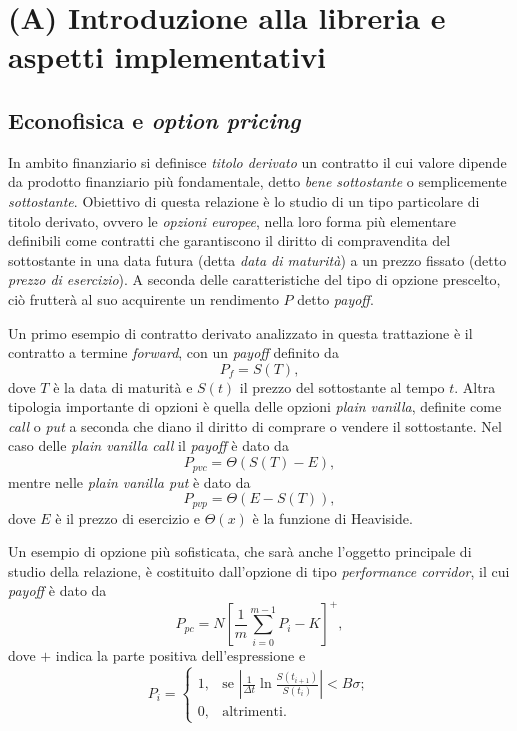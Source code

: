 \chapter{(A) Introduzione alla libreria e aspetti implementativi}
\section{Econofisica e \textit{option pricing}}
In ambito finanziario si definisce \textit{titolo derivato} un contratto il cui valore dipende da prodotto finanziario più fondamentale, detto \textit{bene sottostante} o semplicemente \textit{sottostante}. Obiettivo di questa relazione è lo studio di un tipo particolare di titolo derivato, ovvero le \textit{opzioni europee}, nella loro forma più elementare definibili come contratti che garantiscono il diritto di compravendita del sottostante in una data futura (detta \textit{data di maturità}) a un prezzo fissato (detto \textit{prezzo di esercizio}). A seconda delle caratteristiche del tipo di opzione prescelto, ciò frutterà al suo acquirente un rendimento $P$ detto \textit{payoff}.

Un primo esempio di contratto derivato analizzato in questa trattazione è il contratto a termine \textit{forward}, con un \textit{payoff} definito da
\begin{equation}
    P_f = S(T),
    \label{eq:forward_payoff}
\end{equation}
dove $T$ è la data di maturità e $S(t)$ il prezzo del sottostante al tempo $t$. Altra tipologia importante di opzioni è quella delle opzioni \textit{plain vanilla}, definite come \textit{call} o \textit{put} a seconda che diano il diritto di comprare o vendere il sottostante. Nel caso delle \textit{plain vanilla call} il \textit{payoff} è dato da
\begin{equation}
    P_{pvc} = \Theta(S(T)-E),
    \label{eq:pvc_payoff}
\end{equation}
mentre nelle \textit{plain vanilla put} è dato da
\begin{equation}
    P_{pvp} = \Theta(E-S(T)),
    \label{eq:pvp_payoff}
\end{equation}
dove $E$ è il prezzo di esercizio e $\Theta(x)$ è la funzione di Heaviside.

Un esempio di opzione più sofisticata, che sarà anche l'oggetto principale di studio della relazione, è costituito dall'opzione di tipo \textit{performance corridor}, il cui \textit{payoff} è dato da
\begin{equation}
    P_{pc} = N\left[ \frac{1}{m} \sum_{i=0}^{m-1}{P_i} - K \right]^+,
    \label{eq:performancecorridor_payoff}
\end{equation}
dove $+$ indica la parte positiva dell'espressione e
\begin{equation}
    P_i = \begin{cases}
    1, & \text{se} \,\,\left| \frac{1}{\Delta t} \ln{\frac{S(t_{i+1})}{S(t_i)}} \right| < B \sigma;\\
    0, & \text{altrimenti}.
  \end{cases}
    \label{eq:performancecorridor_barrier}
\end{equation}

